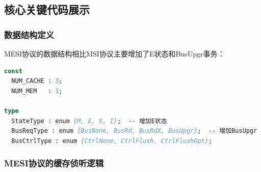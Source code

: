 \documentclass[a4paper]{article}
\begin{document}
\subsection{核心关键代码展示}

\subsubsection{数据结构定义}

MESI协议的数据结构相比MSI协议主要增加了E状态和BusUpgr事务：

\begin{lstlisting}[language=pascal]
const
  NUM_CACHE : 3;
  NUM_MEM   : 1;

type
  StateType : enum {M, E, S, I};  -- 增加E状态
  BusReqType : enum {BusNone, BusRd, BusRdX, BusUpgr};  -- 增加BusUpgr
  BusCtrlType : enum {CtrlNone, CtrlFlush, CtrlFlushOpt};
\end{lstlisting}

\subsubsection{MESI协议的缓存侦听逻辑}
\end{document}
